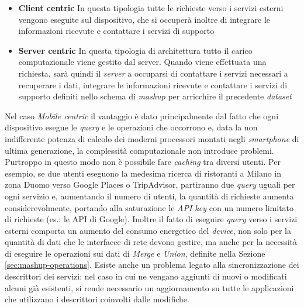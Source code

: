 \begin{itemize}
	\item \textbf{Client centric}
	In questa tipologia tutte le richieste verso i servizi esterni vengono eseguite sul dispositivo, che si occuperà inoltre di integrare le informazioni ricevute e contattare i servizi di supporto
	\item \textbf{Server centric}
	In questa tipologia di architettura tutto il carico computazionale viene gestito dal server. Quando viene effettuata una richiesta, sarà quindi il \emph{server} a occuparsi di contattare i servizi necessari a recuperare i dati, integrare le informazioni ricevute e contattare i servizi di supporto definiti nello schema di \emph{mashup} per arricchire il precedente \emph{dataset}
\end{itemize}

Nel caso \emph{Mobile centric} il vantaggio è dato principalmente dal fatto che ogni dispositivo esegue le \emph{query} e le operazioni che occorrono e, data la non indifferente potenza di calcolo dei moderni processori montati negli \emph{smartphone} di ultima generazione, la complessità computazionale non introduce problemi.
Purtroppo in questo modo non è possibile fare \emph{caching} tra diversi utenti. Per esempio, se due utenti eseguono la medesima ricerca di ristoranti a Milano in zona Duomo verso Google Places o TripAdvisor, partiranno due \emph{query} uguali per ogni servizio e, aumentando il numero di utenti, la quantità di richieste aumenta considerevolmente, portando alla saturazione le \emph{API key} con un numero limitato di richieste (es.: le API di Google). Inoltre il fatto di eseguire \emph{query} verso i servizi esterni comporta un aumento del consumo energetico del \emph{device}, non solo per la quantità di dati che le interfacce di rete devono gestire, ma anche per la necessità di eseguire le operazioni sui dati di \emph{Merge} e \emph{Union}, definite nella Sezione \ref{sec:mashup-operations}. 
Esiste anche un problema legato alla sincronizzazione dei descrittori dei servizi: nel caso in cui ne vengano aggiunti di nuovi o modificati alcuni già esistenti, si rende necessario un aggiornamento su tutte le applicazioni che utilizzano i descrittori coinvolti dalle modifiche.


